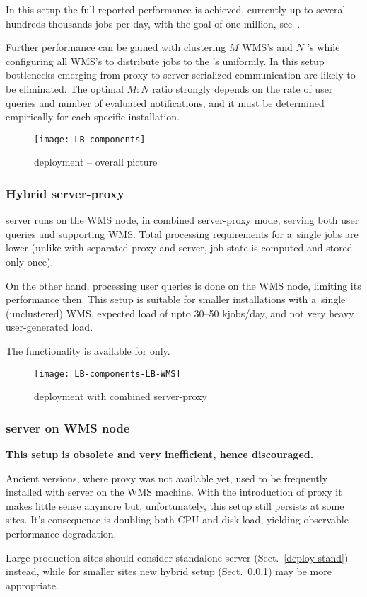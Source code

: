 In this setup the full reported performance is achieved,
currently up to several hundreds thousands jobs per day, with the goal
of one million, see~\cite{lbtp}.

Further performance can be gained with clustering $M$ WMS's and $N$ \LB's
while configuring all WMS's to distribute jobs to the \LB's uniformly.
In this setup bottlenecks emerging from \LB proxy to \LB server serialized
communication are likely to be eliminated.
The optimal $M:N$ ratio strongly depends on the rate of user queries
and number of evaluated notifications,
and it must be determined empirically for each specific installation.

\begin{figure}[ht]
\centering
\texttt{[image: LB-components]}
\caption{\LB deployment -- overall picture} 
\label{f:comp}
\end{figure}


\subsubsection{Hybrid \LB server-proxy}
\label{deploy-hybrid}

\LB server runs on the WMS node, in combined server-proxy mode,
serving both user queries and supporting WMS.
Total processing requirements for a~single jobs are lower
(unlike with separated proxy and server, job state is computed and stored only once).

On the other hand, processing user queries is done on the WMS node,
limiting its performance then.
This setup is suitable for smaller installations with a~single (unclustered)
WMS, expected load of upto 30--50 kjobs/day, and not very heavy user-generated
load.

The functionality is available for \LBnew only.

\begin{figure}[ht]
\centering
\texttt{[image: LB-components-LB-WMS]}
\caption{\LB deployment with combined server-proxy}
\label{f:comp-hybrid}
\end{figure}


\subsubsection{\LB server on WMS node}

\textbf{This setup is obsolete and very inefficient, hence discouraged.}

Ancient \LB versions, where \LB proxy was not available yet,
used to be frequently installed with \LB server on the WMS machine.
With the introduction of \LB proxy it makes little sense anymore
but, unfortunately, this setup still persists at some sites.
It's consequence is doubling both CPU and disk load, yielding observable
performance degradation.

Large production sites should consider standalone \LB server (Sect.~\ref{deploy-stand})
instead, while for smaller sites new hybrid setup (Sect.~\ref{deploy-hybrid}) may
be more appropriate.
